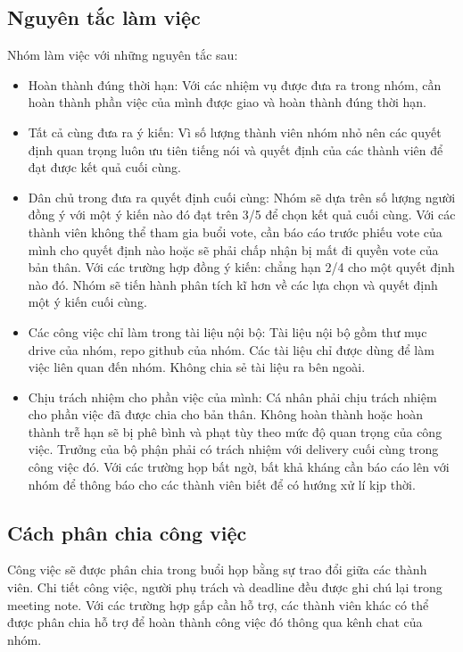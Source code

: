 \subsection{Nguyên tắc làm việc}
Nhóm làm việc với những nguyên tắc sau:
\begin{itemize}
    \item Hoàn thành đúng thời hạn: Với các nhiệm vụ được đưa ra trong nhóm, cần hoàn thành phần việc của mình được giao và hoàn thành đúng thời hạn.
    \item Tất cả cùng đưa ra ý kiến: Vì số lượng thành viên nhóm nhỏ nên các quyết định quan trọng luôn ưu tiên tiếng nói và quyết định của các thành viên để đạt được kết quả cuối cùng.
    \item Dân chủ trong đưa ra quyết định cuối cùng: Nhóm sẽ dựa trên số lượng người đồng ý với một ý kiến nào đó đạt trên 3/5 để chọn kết quả cuối cùng. Với các thành viên không thể tham gia buổi vote, cần báo cáo trước phiếu vote của mình cho quyết định nào hoặc sẽ phải chấp nhận bị mất đi quyền vote của bản thân. Với các trường hợp đồng ý kiến: chẳng hạn 2/4 cho một quyết định nào đó. Nhóm sẽ tiến hành phân tích kĩ hơn về các lựa chọn và quyết định một ý kiến cuối cùng.
    \item Các công việc chỉ làm trong tài liệu nội bộ: Tài liệu nội bộ gồm thư mục drive của nhóm, repo github của nhóm. Các tài liệu chỉ được dùng để làm việc liên quan đến nhóm. Không chia sẻ tài liệu ra bên ngoài.
    \item Chịu trách nhiệm cho phần việc của mình: Cá nhân phải chịu trách nhiệm cho phần việc đã được chia cho bản thân. Không hoàn thành hoặc hoàn thành trễ hạn sẽ bị phê bình và phạt tùy theo mức độ quan trọng của công việc. Trưởng của bộ phận phải có trách nhiệm với delivery cuối cùng trong công việc đó. Với các trường họp bất ngờ, bất khả kháng cần báo cáo lên với nhóm để thông báo cho các thành viên biết để có hướng xử lí kịp thời.
\end{itemize}

\subsection{Cách phân chia công việc}
Công việc sẽ được phân chia trong buổi họp bằng sự trao đổi giữa các thành viên. Chi tiết công việc, người phụ trách và deadline đều được ghi chú lại trong meeting note. Với các trường hợp gấp cần hỗ trợ, các thành viên khác có thể được phân chia hỗ trợ để hoàn thành công việc đó thông qua kênh chat của nhóm. 

